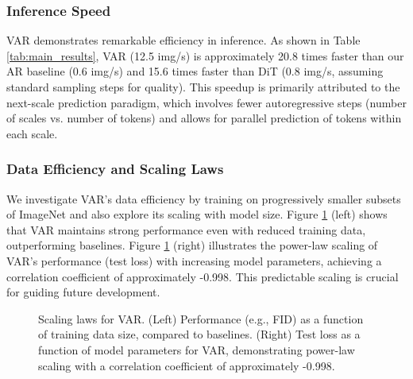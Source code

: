 \documentclass{article}
\begin{document}
\subsubsection{Inference Speed}
VAR demonstrates remarkable efficiency in inference. As shown in Table \ref{tab:main_results}, VAR (12.5 img/s) is approximately 20.8 times faster than our AR baseline (0.6 img/s) and 15.6 times faster than DiT (0.8 img/s, assuming standard sampling steps for quality). This speedup is primarily attributed to the next-scale prediction paradigm, which involves fewer autoregressive steps (number of scales vs. number of tokens) and allows for parallel prediction of tokens within each scale.

\subsubsection{Data Efficiency and Scaling Laws}
\label{ssec:scaling_laws}
We investigate VAR's data efficiency by training on progressively smaller subsets of ImageNet and also explore its scaling with model size. Figure \ref{fig:scaling_laws} (left) shows that VAR maintains strong performance even with reduced training data, outperforming baselines. Figure \ref{fig:scaling_laws} (right) illustrates the power-law scaling of VAR's performance (test loss) with increasing model parameters, achieving a correlation coefficient of approximately -0.998. This predictable scaling is crucial for guiding future development.

\begin{figure}[htbp]
\centering
\fbox{\rule{0.9\textwidth}{7cm}} %
\caption{Scaling laws for VAR. (Left) Performance (e.g., FID) as a function of training data size, compared to baselines. (Right) Test loss as a function of model parameters for VAR, demonstrating power-law scaling with a correlation coefficient of approximately -0.998.}
\label{fig:scaling_laws}
\end{figure}
\end{document}
